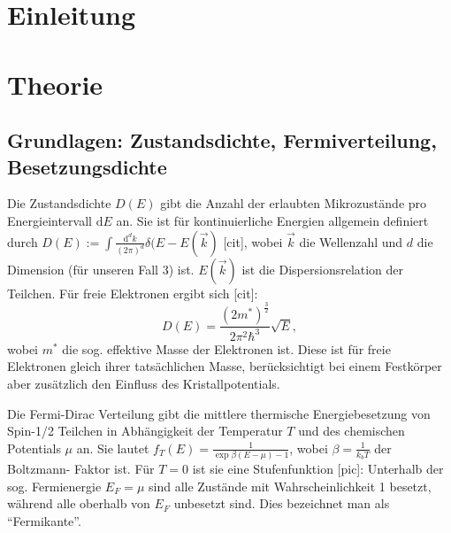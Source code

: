 \documentclass[twoside,        %
               BCOR12mm,       %
               english,ngerman, %
               fleqn,headsepline=false,footsepline=false
              ]{Vorlage/MFPREPORT}
\renewcommand{\d}{\ensuremath{\mathrm{d}}} %
\begin{document}
\date{\today}
\CopyNotWanted

\maketitle


\tableofcontents

\clearpage
{}

\section{Einleitung}
\label{sec:einleitung}
\section{Theorie}
\label{sec:theorie}
\subsection{Grundlagen: Zustandsdichte, Fermiverteilung, Besetzungsdichte}
Die Zustandsdichte $D(E)$ gibt die Anzahl der erlaubten Mikrozustände pro
Energieintervall $\d E$ an. Sie ist für kontinuierliche Energien allgemein
definiert durch $D(E):=\int \frac{\d^d k}{(2 \pi)^d}\delta(E-E(\vec{k})$ [cit],
wobei $\vec k$ die Wellenzahl und $d$ die Dimension (für unseren Fall 3) ist.
$E(\vec k)$ ist die Dispersionsrelation der Teilchen.
Für freie Elektronen ergibt sich [cit]:
\begin{equation}
    D(E)=\frac{\left(2m^*\right)^\frac{3}{2}}{2\pi ^2\hbar ^3}\sqrt{E}, 
\end{equation}
wobei $m^*$ die sog. effektive Masse der Elektronen ist. Diese ist für freie
Elektronen gleich ihrer tatsächlichen Masse, berücksichtigt bei einem
Festkörper aber zusätzlich den Einfluss des Kristallpotentials.

Die Fermi-Dirac Verteilung gibt die mittlere thermische Energiebesetzung von Spin-1/2
Teilchen in Abhängigkeit der Temperatur $T$ und des chemischen Potentials $\mu$
an. Sie lautet $f_T(E)=\frac{1}{\exp{\beta(E-\mu)-1}}$, wobei
$\beta=\frac{1}{k_b T}$ der Boltzmann- Faktor ist. Für $T=0$ ist sie eine
Stufenfunktion [pic]: Unterhalb der sog. Fermienergie $E_F=\mu$ sind alle
Zustände mit Wahrscheinlichkeit 1 besetzt, während alle oberhalb von $E_F$
unbesetzt sind. Dies bezeichnet man als ``Fermikante''.
\end{document}
